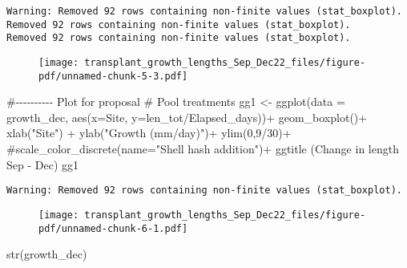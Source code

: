 \documentclass[
  letterpaper,
  DIV=11,
  numbers=noendperiod]{scrartcl}
\newenvironment{Shaded}{\begin{snugshade}}{\end{snugshade}}
\newcommand{\AttributeTok}[1]{\textcolor[rgb]{0.40,0.45,0.13}{#1}}
\newcommand{\CommentTok}[1]{\textcolor[rgb]{0.37,0.37,0.37}{#1}}
\newcommand{\DecValTok}[1]{\textcolor[rgb]{0.68,0.00,0.00}{#1}}
\newcommand{\FunctionTok}[1]{\textcolor[rgb]{0.28,0.35,0.67}{#1}}
\newcommand{\NormalTok}[1]{\textcolor[rgb]{0.00,0.23,0.31}{#1}}
\newcommand{\OtherTok}[1]{\textcolor[rgb]{0.00,0.23,0.31}{#1}}
\newcommand{\SpecialCharTok}[1]{\textcolor[rgb]{0.37,0.37,0.37}{#1}}
\newcommand{\StringTok}[1]{\textcolor[rgb]{0.13,0.47,0.30}{#1}}
\begin{document}
\begin{verbatim}
Warning: Removed 92 rows containing non-finite values (stat_boxplot).
Removed 92 rows containing non-finite values (stat_boxplot).
Removed 92 rows containing non-finite values (stat_boxplot).
\end{verbatim}

\begin{figure}[H]

{\centering \texttt{[image: transplant\_growth\_lengths\_Sep\_Dec22\_files/figure-pdf/unnamed-chunk-5-3.pdf]}

}

\end{figure}

\begin{Shaded}
\begin{Highlighting}[]
\CommentTok{\#{-}{-}{-}{-}{-}{-}{-}{-}{-}{-} Plot for proposal}
\CommentTok{\# Pool treatments}
\NormalTok{gg1 }\OtherTok{\textless{}{-}} \FunctionTok{ggplot}\NormalTok{(}\AttributeTok{data =}\NormalTok{ growth\_dec, }\FunctionTok{aes}\NormalTok{(}\AttributeTok{x=}\NormalTok{Site, }\AttributeTok{y=}\NormalTok{len\_tot}\SpecialCharTok{/}\NormalTok{Elapsed\_days))}\SpecialCharTok{+}
  \FunctionTok{geom\_boxplot}\NormalTok{()}\SpecialCharTok{+}
  \FunctionTok{xlab}\NormalTok{(}\StringTok{"Site"}\NormalTok{) }\SpecialCharTok{+} 
  \FunctionTok{ylab}\NormalTok{(}\StringTok{"Growth (mm/day)"}\NormalTok{)}\SpecialCharTok{+}
  \FunctionTok{ylim}\NormalTok{(}\DecValTok{0}\NormalTok{,}\DecValTok{9}\SpecialCharTok{/}\DecValTok{30}\NormalTok{)}\SpecialCharTok{+}
  \CommentTok{\#scale\_color\_discrete(name="Shell hash addition")+}
  \FunctionTok{ggtitle}\NormalTok{ (}\StringTok{\textquotesingle{}Change in length Sep {-} Dec\textquotesingle{}}\NormalTok{)}
\NormalTok{gg1}
\end{Highlighting}
\end{Shaded}

\begin{verbatim}
Warning: Removed 92 rows containing non-finite values (stat_boxplot).
\end{verbatim}

\begin{figure}[H]

{\centering \texttt{[image: transplant\_growth\_lengths\_Sep\_Dec22\_files/figure-pdf/unnamed-chunk-6-1.pdf]}

}

\end{figure}

\begin{Shaded}
\begin{Highlighting}[]
\FunctionTok{str}\NormalTok{(growth\_dec)}
\end{Highlighting}
\end{Shaded}
\end{document}
